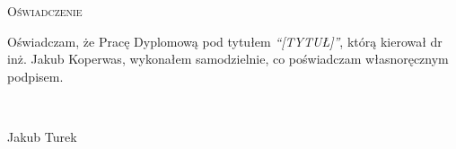 \newpage
\thispagestyle{empty}


\begin{center}
 \LARGE\textsc{Oświadczenie}
\end{center}

\vspace{1cm}

Oświadczam, że Pracę Dyplomową pod tytułem \emph{``[TYTUŁ]''}, którą kierował dr inż. Jakub Koperwas, wykonałem samodzielnie, co poświadczam własnoręcznym podpisem.

\vspace{2cm}

\begin{flushright}
\begin{minipage}{5cm}
 \dotfill \\[-0.7cm]
 \begin{center}
  \small Jakub Turek
 \end{center}
\end{minipage}
\end{flushright}

